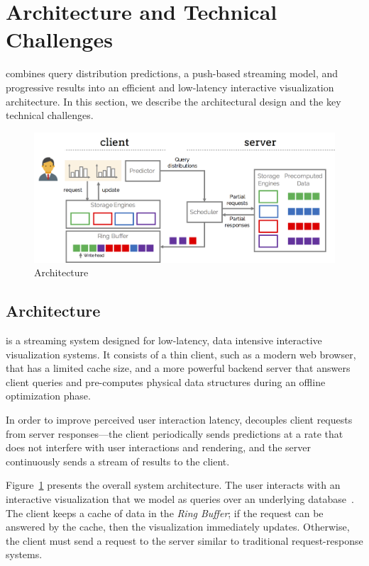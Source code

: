 \section{Architecture and Technical Challenges}\label{s:arch}
\sys combines query distribution predictions, a push-based streaming model, and progressive results into an efficient and low-latency interactive visualization architecture.  In this section, we describe the architectural design and the key technical challenges.

\begin{figure}[tb]
	\centering
	\includegraphics[width=\columnwidth]{figures/arch}
 	\caption{\sys Architecture}
  \label{fig:arch}
\end{figure}

\subsection{Architecture}

\sys is a streaming system designed for low-latency, data intensive interactive visualization systems.  It  consists of a thin client, such as a modern web browser, that has a limited cache size, and a more powerful backend server that answers client queries and pre-computes physical data structures during an offline optimization phase.  

In order to improve perceived user interaction latency, \sys decouples client requests from server responses---the client periodically sends predictions at a rate that does not interfere with user interactions and rendering, and the server continuously sends a stream of results to the client. 

Figure~\ref{fig:arch} presents the overall system architecture.
The user interacts with an interactive visualization that we model as queries over an underlying database~\cite{wucombining,EugeneWuVision2014}.  The client keeps a cache of data in the {\it Ring Buffer}; if the request can be answered by the cache, then the visualization immediately updates.  Otherwise, the client must send a request to the server similar to traditional request-response systems.

